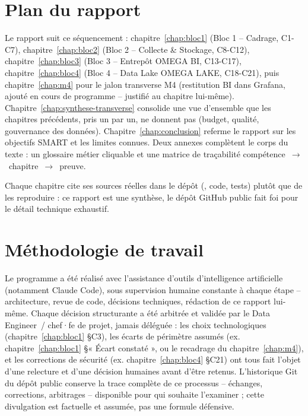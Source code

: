 \section{Plan du rapport}

Le rapport suit ce séquencement : chapitre~\ref{chap:bloc1} (Bloc 1 --
Cadrage, C1-C7), chapitre~\ref{chap:bloc2} (Bloc 2 -- Collecte \&
Stockage, C8-C12), chapitre~\ref{chap:bloc3} (Bloc 3 -- Entrepôt OMEGA
BI, C13-C17), chapitre~\ref{chap:bloc4} (Bloc 4 -- Data Lake OMEGA
LAKE, C18-C21), puis chapitre~\ref{chap:m4} pour le jalon transverse
M4 (restitution BI dans Grafana, ajouté en cours de programme --
justifié au chapitre lui-même). Chapitre~\ref{chap:synthese-transverse}
consolide une vue d'ensemble que les chapitres précédents, pris un par
un, ne donnent pas (budget, qualité, gouvernance des données).
Chapitre~\ref{chap:conclusion} referme le rapport sur les objectifs
SMART et les limites connues. Deux annexes complètent le corps du
texte : un glossaire métier cliquable et une matrice de traçabilité
compétence~$\rightarrow$~chapitre~$\rightarrow$~preuve.

Chaque chapitre cite ses sources réelles dans le dépôt
(, code, tests) plutôt que de les
reproduire : ce rapport est une synthèse, le dépôt GitHub public fait
foi pour le détail technique exhaustif.

\section{Méthodologie de travail}

Le programme a été réalisé avec l'assistance d'outils d'intelligence
artificielle (notamment Claude Code), sous supervision humaine
constante à chaque étape -- architecture, revue de code, décisions
techniques, rédaction de ce rapport lui-même. Chaque décision
structurante a été arbitrée et validée par le Data Engineer~/
chef·fe de projet, jamais déléguée : les choix technologiques
(chapitre~\ref{chap:bloc1} §C3), les écarts de périmètre assumés
(ex. chapitre~\ref{chap:bloc1} §« Écart constaté », ou le
recadrage du chapitre~\ref{chap:m4}), et les corrections de sécurité
(ex. chapitre~\ref{chap:bloc4} §C21) ont tous fait l'objet d'une
relecture et d'une décision humaines avant d'être retenus. L'historique
Git du dépôt public conserve la trace complète de ce processus --
échanges, corrections, arbitrages -- disponible pour qui souhaite
l'examiner ; cette divulgation est factuelle et assumée, pas une
formule défensive.
